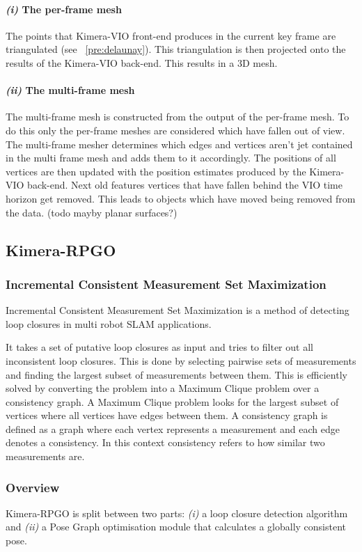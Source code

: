 \documentclass[11pt,a4paper]{article}
\begin{document}
\paragraph{\textit{(i)} The per-frame mesh}
The points that Kimera-VIO front-end produces in the current key frame are triangulated (see ~\ref{pre:delaunay}).
This triangulation is then projected onto the results of the Kimera-VIO back-end. This results in a 3D mesh. 

\paragraph{\textit{(ii)} The multi-frame mesh}
The multi-frame mesh is constructed from the output of the per-frame mesh.
To do this only the per-frame meshes are considered which have fallen out of view.
The multi-frame mesher determines which edges and vertices aren't jet contained in the multi frame mesh and adds them to it accordingly. 
The positions of all vertices are then updated with the position estimates produced by the Kimera-VIO back-end.
Next old features vertices that have fallen behind the VIO time horizon get removed. 
This leads to objects which have moved being removed from the data. 
(todo mayby planar surfaces?)

\subsection{Kimera-RPGO}

\subsubsection{Incremental Consistent Measurement Set Maximization} \label{pre:PCM}
Incremental Consistent Measurement Set Maximization is a  method of detecting loop closures in multi robot SLAM applications. 

It takes a set of putative loop closures as input and tries to filter out all inconsistent loop closures. 
This is done by selecting pairwise sets of measurements and finding the largest subset of measurements between them.
This is efficiently solved by converting the problem into a Maximum Clique problem over a consistency graph. 
A Maximum Clique problem looks for the largest subset of vertices where all vertices have edges between them. 
A consistency graph is defined as a graph where each vertex represents a measurement and each edge denotes a consistency.
In this context consistency refers to how similar two measurements are.
\subsubsection {Overview}
Kimera-RPGO is split between two parts: \textit{(i)} a loop closure detection algorithm and \textit{(ii)} a Pose Graph optimisation module that calculates a globally consistent pose.
\end{document}
